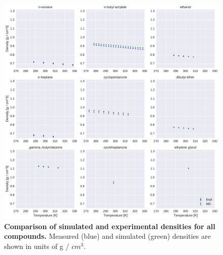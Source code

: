 \documentclass[aip, jcp, reprint]{revtex4-1}  %
\begin{document}
\begin{figure}[alldensity]

\ContinuedFloat

\includegraphics[width=\textwidth]{./figures/densities_versus_temperature_part4.pdf}

\caption{{\bf Comparison of simulated and experimental densities for all compounds.} 
Measured (blue) and simulated (green) densities are shown in units of g / $cm^{3}$.
\label{figure:AllDensities}
}

\end{figure}



\end{document}
